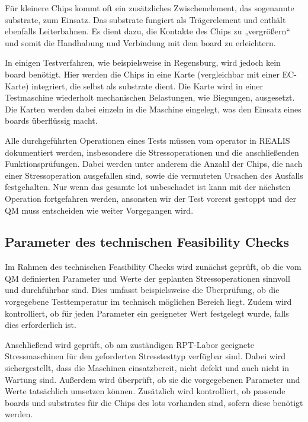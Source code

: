 Für kleinere Chips kommt oft ein zusätzliches Zwischenelement, das sogenannte \gls{substrate}, zum Einsatz. Das \gls{substrate} fungiert als Trägerelement und enthält ebenfalls Leiterbahnen. Es dient dazu, die Kontakte des Chips zu „vergrößern“ und somit die Handhabung und Verbindung mit dem \gls{board} zu erleichtern.

In einigen Testverfahren, wie beispielsweise in Regensburg, wird jedoch kein \gls{board} benötigt. Hier werden die Chips in eine Karte (vergleichbar mit einer EC-Karte) integriert, die selbst als \gls{substrate} dient. Die Karte wird in einer Testmaschine wiederholt mechanischen Belastungen, wie Biegungen, ausgesetzt. Die Karten werden dabei einzeln in die Maschine eingelegt, was den Einsatz eines \glspl{board} überflüssig macht.

Alle durchgeführten Operationen eines Tests müssen vom \gls{operator} in \gls{REALIS} dokumentiert werden, insbesondere die Stressoperationen und die anschließenden Funktionsprüfungen. Dabei werden unter anderem die Anzahl der Chips, die nach einer Stressoperation ausgefallen sind, sowie die vermuteten Ursachen des Ausfalls festgehalten.
Nur wenn das gesamte \gls{lot} unbeschadet ist kann mit der nächsten Operation fortgefahren werden, ansonsten wir der Test vorerst gestoppt und der \gls{QM} muss entscheiden wie weiter Vorgegangen wird.

\subsection{Parameter des technischen Feasibility Checks}

Im Rahmen des technischen Feasibility Checks wird zunächst geprüft, ob die vom \gls{QM} definierten Parameter und Werte der geplanten Stressoperationen sinnvoll und durchführbar sind. Dies umfasst beispielsweise die Überprüfung, ob die vorgegebene Testtemperatur im technisch möglichen Bereich liegt. Zudem wird kontrolliert, ob für jeden Parameter ein geeigneter Wert festgelegt wurde, falls dies erforderlich ist.

Anschließend wird geprüft, ob am zuständigen \gls{RPT}-Labor geeignete Stressmaschinen für den geforderten Stresstesttyp verfügbar sind. Dabei wird sichergestellt, dass die Maschinen einsatzbereit, nicht defekt und auch nicht in Wartung sind. Außerdem wird überprüft, ob sie die vorgegebenen Parameter und Werte tatsächlich umsetzen können. Zusätzlich wird kontrolliert, ob passende \glspl{board} und \glspl{substrate} für die Chips des \glspl{lot} vorhanden sind, sofern diese benötigt werden.

